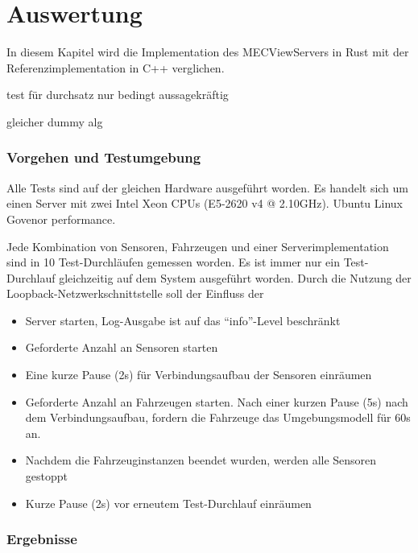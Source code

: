
			
\chapter{Auswertung}

In diesem Kapitel wird die Implementation des MECViewServers in Rust mit der Referenzimplementation in C++ verglichen.

test für durchsatz nur bedingt aussagekräftig

gleicher dummy alg

\subsection{Vorgehen und Testumgebung}

Alle Tests sind auf der gleichen Hardware ausgeführt worden.
Es handelt sich um einen Server mit zwei Intel Xeon CPUs (E5-2620 v4 @ 2.10GHz).
Ubuntu Linux
Govenor performance.

Jede Kombination von Sensoren, Fahrzeugen und einer Serverimplementation sind in 10 Test-Durchläufen gemessen worden.
Es ist immer nur ein Test-Durchlauf gleichzeitig auf dem System ausgeführt worden.
Durch die Nutzung der Loopback-Netzwerkschnittstelle soll der Einfluss der 

\begin{itemize}
	\item Server starten, Log-Ausgabe ist auf das \enquote{info}-Level beschränkt
	\item Geforderte Anzahl an Sensoren starten
	\item Eine kurze Pause (2s) für Verbindungsaufbau der Sensoren einräumen
	\item Geforderte Anzahl an Fahrzeugen starten. Nach einer kurzen Pause (5s) nach dem Verbindungsaufbau, fordern die Fahrzeuge das Umgebungsmodell für 60s an.
	\item Nachdem die Fahrzeuginstanzen beendet wurden, werden alle Sensoren gestoppt
	\item Kurze Pause (2s) vor erneutem Test-Durchlauf einräumen
\end{itemize}

\subsection{Ergebnisse}

